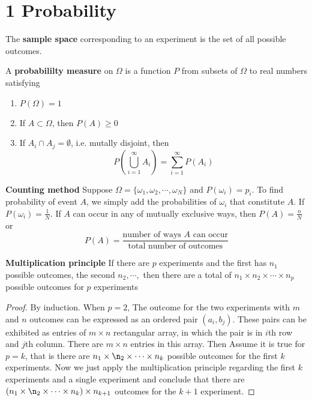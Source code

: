 \documentclass[11pt]{article}
\begin{document}
\section*{1 Probability}

\begin{defn*}
  The \textbf{sample space} corresponding to an experiment is the set of all possible outcomes.
\end{defn*}

\begin{defn*}
  A \textbf{probabililty measure} on $\Omega$ is a function $P$ from subsets of $\Omega$ to real numbers satisfying
  \begin{enumerate}
    \item $P(\Omega) =1$
    \item If $A\subset \Omega$, then $P(A) \geq 0$
    \item If $A_i \cap A_j = \emptyset$, i.e. mutally disjoint, then
    \[
      P( \bigcup_{i=1}^{\infty} A_i ) = \sum_{i=1}^{\infty} P(A_i)
    \]
  \end{enumerate}
\end{defn*}

\begin{defn*}
  \textbf{Counting method} Suppose $\Omega = \{ \omega_1, \omega_2,\cdots, \omega_N\}$ and $P(\omega_i) = p_i$. To find probability of event $A$, we simply add the probabilities of $\omega_i$ that constitute $A$. If $P(\omega_i) = \frac{1}{N}$. If $A$ can occur in any of mutually exclusive ways, then $P(A) = \frac{n}{N}$ or
  \[
    P(A) = \frac{\text{number of ways $A$ can occur}}{\text{total number of outcomes}}
  \]
\end{defn*}


\begin{defn*}
  \textbf{Multiplication principle} If there are $p$ experiments and the first has $n_1$ possible outcomes, the second $n_2, \cdots,$ then there are a total of $n_1 \times n_2 \times \cdots \times n_p$ possible outcomes for $p$ experiments
  \begin{proof}
    By induction. When $p=2$, The outcome for the two experiments with $m$ and $n$ outcomes can be expressed as an ordered pair $(a_i, b_j)$. These pairs can be exhibited as entries of $m\times n$ rectangular array, in which the pair is in $i$th row and $j$th column. There are $m\times n$ entries in this array. Then Assume it is true for $p=k$, that is there are $n_1 \times \n_2 \times \cdots \times n_k$ possible outcomes for the first $k$ experiments. Now we just apply the multiplication principle regarding the first $k$ experiments and a single experiment and conclude that there are $(n_1 \times \n_2 \times \cdots \times n_k) \times n_{k+1}$ outcomes for the $k+1$ experiment.
  \end{proof}
\end{defn*}
\end{document}
